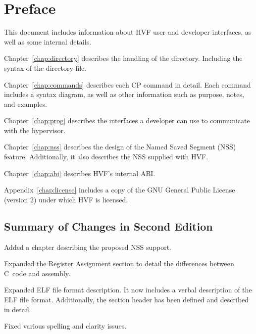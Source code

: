 \chapter*{Preface}
This document includes information about HVF user and developer interfaces,
as well as some internal details.

Chapter~\ref{chap:directory} describes the handling of the directory.
Including the syntax of the directory file.

Chapter~\ref{chap:commands} describes each CP command in detail.  Each
command includes a syntax diagram, as well as other information such as
purpose, notes, and examples.

Chapter~\ref{chap:prog} describes the interfaces a developer can use to
communicate with the hypervisor.

\cbstart
Chapter~\ref{chap:nss} describes the design of the Named Saved Segment (NSS)
feature.  Additionally, it also describes the NSS supplied with HVF.
\cbend

Chapter~\ref{chap:abi} describes HVF's internal ABI.

Appendix~\ref{chap:license} includes a copy of the GNU General Public
License (version 2) under which HVF is licensed.

\cbstart
\section*{Summary of Changes in Second Edition}
Added a chapter describing the proposed NSS support.

Expanded the Register Assignment section to detail the differences between
C~code and assembly.

Expanded ELF file format description.  It now includes a verbal description
of the ELF file format.  Additionally, the section header has been defined
and described in detail.

Fixed various spelling and clarity issues.
\cbend
